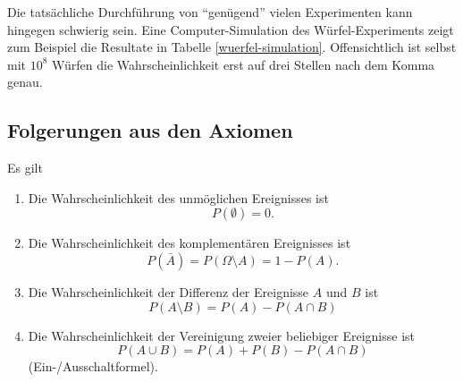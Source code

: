 Die tatsächliche Durchführung von ``genügend'' vielen Experimenten
kann hingegen schwierig sein.
Eine Computer-Simulation des
Würfel-Experiments zeigt zum Beispiel die Resultate in Tabelle
\ref{wuerfel-simulation}.
Offensichtlich ist selbst mit $10^8$
Würfen die Wahrscheinlichkeit erst auf drei Stellen nach dem Komma
genau.

\subsection{Folgerungen aus den Axiomen}
\begin{satz}Es gilt
\begin{enumerate}
\item Die Wahrscheinlichkeit des unmöglichen Ereignisses ist
\begin{equation}
P(\emptyset) = 0.
\label{p-emptyset}
\end{equation}
\item Die Wahrscheinlichkeit des komplementären Ereignisses
ist
\begin{equation}
P(\bar A) = P(\Omega\setminus A) = 1 -P(A).
\label{p-negation}
\end{equation}
\item Die Wahrscheinlichkeit der Differenz der Ereignisse $A$ und $B$
ist
\begin{equation}
P(A\setminus B) = P(A) - P(A\cap B)
\label{p-complement} %
\end{equation}
\item Die Wahrscheinlichkeit der Vereinigung zweier beliebiger Ereignisse
ist
\begin{equation}
P(A\cup B) = P(A) + P(B) - P(A\cap B)
\label{p-union}
\end{equation}
(Ein-/Ausschaltformel).
\end{enumerate}
\end{satz}

